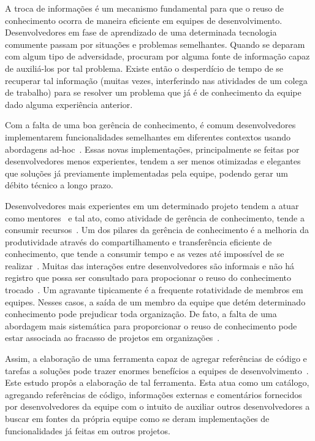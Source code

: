A troca de informações é um mecanismo fundamental para que o reuso de conhecimento ocorra de maneira eficiente em equipes de desenvolvimento. Desenvolvedores em fase de aprendizado de uma determinada tecnologia comumente passam por situações e problemas semelhantes. Quando se deparam com algum tipo de adversidade, procuram por alguma fonte de informação capaz de auxiliá-los por tal problema. Existe então o desperdício de tempo de se recuperar tal informação (muitas vezes, interferindo nas atividades de um colega de trabalho) para se resolver um problema que já é de conhecimento da equipe dado alguma experiência anterior.


Com a falta de uma boa gerência de conhecimento, é comum desenvolvedores implementarem funcionalidades semelhantes em diferentes contextos usando abordagens ad-hoc~\cite{SangMok2011}. Essas novas implementações, principalmente se feitas por desenvolvedores menos experientes, tendem a ser menos otimizadas e elegantes que soluções já previamente implementadas pela equipe, podendo gerar um débito técnico a longo prazo.

Desenvolvedores mais experientes em um determinado projeto tendem a atuar como mentores~\cite{CubraniC2004} e tal ato, como atividade de gerência de conhecimento, tende a consumir recursos~\cite{Wiig2003}. Um dos pilares da gerência de conhecimento é a melhoria da produtividade através do compartilhamento e transferência eficiente de conhecimento, que tende a consumir tempo e as vezes até impossível de se realizar~\cite{Levy2009}.
Muitas das interações entre desenvolvedores são informais e não há registro que possa ser consultado para propocionar o reuso do conhecimento trocado~\cite{Olson2000}. Um agravante tipicamente é a frequente rotatividade de membros em equipes. Nesses casos, a saída de um membro da equipe que detém determinado conhecimento pode prejudicar toda organização. De fato, a falta de uma abordagem mais sistemática para proporcionar o reuso de conhecimento pode estar associada ao fracasso de projetos em organizações~\cite{Hall2008}.

Assim, a elaboração de uma ferramenta capaz de agregar referências de código e tarefas a soluções pode trazer enormes benefícios a equipes de desenvolvimento~\cite{CubraniC2004}. Este estudo propôs a elaboração de tal ferramenta. Esta atua como um catálogo, agregando referências de código, informações externas e comentários fornecidos por desenvolvedores da equipe com o intuito de auxiliar outros desenvolvedores a buscar em fontes da própria equipe como se deram implementações de funcionalidades já feitas em outros projetos.

